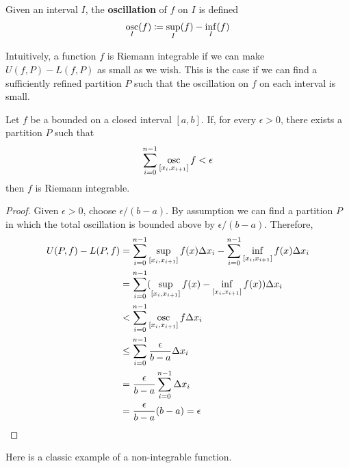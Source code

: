   \begin{definition}[Oscillation]
    Given an interval $I$, the \textbf{oscillation} of $f$ on $I$ is defined 
    \begin{equation}
      \mathop{\operatorname{osc}}_{I} (f) \coloneqq \sup_I (f) - \inf_I (f)
    \end{equation}
  \end{definition}

  Intuitively, a function $f$ is Riemann integrable if we can make $U(f, P) - L(f, P)$ as small as we wish. This is the case if we can find a sufficiently refined partition $P$ such that the oscillation on $f$ on each interval is small. 

  \begin{lemma}
    Let $f$ be a bounded on a closed interval $[a, b]$. If, for every $\epsilon > 0$, there exists a partition $P$ such that
    \begin{equation}
      \sum_{i=0}^{n-1} \mathop{\operatorname{osc}}_{[x_i, x_{i+1}]} f < \epsilon
    \end{equation}
    then $f$ is Riemann integrable. 
  \end{lemma}
  \begin{proof}
    Given $\epsilon > 0$, choose $\epsilon/(b-a)$. By assumption we can find a partition $P$ in which the total oscillation is bounded above by $\epsilon/(b-a)$. Therefore, 
    \begin{align}
      U(P, f) - L(P, f) & = \sum_{i=0}^{n-1} \sup_{[x_i, x_{i+1}]} f(x) \Delta x_i - \sum_{i=0}^{n-1} \inf_{[x_i, x_{i+1}]} f(x) \Delta x_i \\ 
                        & = \sum_{i=0}^{n-1} (\sup_{[x_i, x_{i+1}]} f(x) - \inf_{[x_i, x_{i+1}]} f(x) ) \Delta x_i \\ 
                        & < \sum_{i=0}^{n-1} \mathop{\operatorname{osc}}_{[x_i, x_{i+1}]} f \Delta x_i \\ 
                        & \leq \sum_{i=0}^{n-1} \frac{\epsilon}{b-a} \Delta x_i \\ 
                        & = \frac{\epsilon}{b-a} \sum_{i=0}^{n-1} \Delta x_i \\
                        & = \frac{\epsilon}{b-a} (b-a) = \epsilon
    \end{align}
  \end{proof} 

  Here is a classic example of a non-integrable function.  

